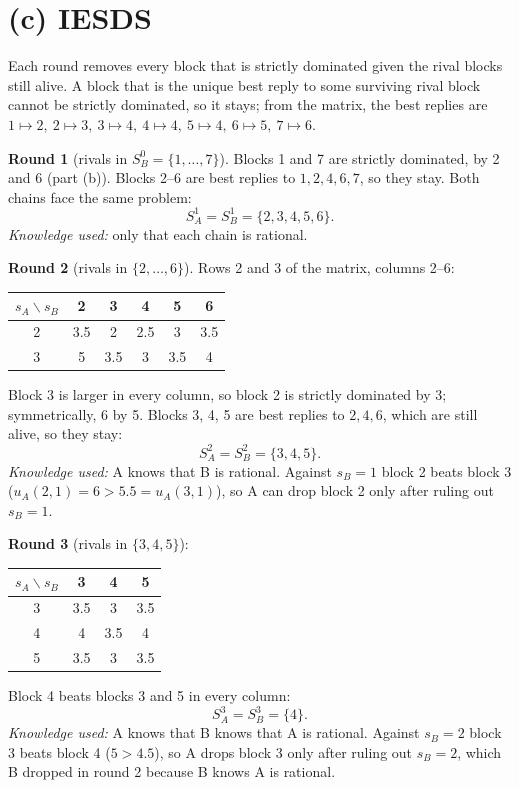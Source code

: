 \documentclass[11pt,a4paper]{article}
\begin{document}
\section*{(c) IESDS}

Each round removes every block that is strictly dominated given the rival blocks still alive. A
block that is the unique best reply to some surviving rival block cannot be strictly dominated, so
it stays; from the matrix, the best replies are
$1 \mapsto 2,\ 2 \mapsto 3,\ 3 \mapsto 4,\ 4 \mapsto 4,\ 5 \mapsto 4,\ 6 \mapsto 5,\ 7 \mapsto 6$.

\textbf{Round 1} (rivals in $S_B^0 = \{1, \dots, 7\}$). Blocks 1 and 7 are strictly dominated,
by 2 and 6 (part (b)). Blocks 2--6 are best replies to $1, 2, 4, 6, 7$, so they stay. Both
chains face the same problem:
\[
  S_A^1 = S_B^1 = \{2, 3, 4, 5, 6\}.
\]
\emph{Knowledge used:} only that each chain is rational.

\textbf{Round 2} (rivals in $\{2, \dots, 6\}$). Rows 2 and 3 of the matrix, columns 2--6:
\begin{center}
\begin{tabular}{c|ccccc}
$s_A \backslash s_B$ & 2 & 3 & 4 & 5 & 6 \\ \midrule
2 & 3.5 & 2 & 2.5 & 3 & 3.5 \\
3 & 5 & 3.5 & 3 & 3.5 & 4
\end{tabular}
\end{center}
Block 3 is larger in every column, so block 2 is strictly dominated by 3; symmetrically, 6 by 5.
Blocks 3, 4, 5 are best replies to $2, 4, 6$, which are still alive, so they stay:
\[
  S_A^2 = S_B^2 = \{3, 4, 5\}.
\]
\emph{Knowledge used:} A knows that B is rational. Against $s_B = 1$ block 2 beats block 3
($u_A(2, 1) = 6 > 5.5 = u_A(3, 1)$), so A can drop block 2 only after ruling out $s_B = 1$.

\textbf{Round 3} (rivals in $\{3, 4, 5\}$):
\begin{center}
\begin{tabular}{c|ccc}
$s_A \backslash s_B$ & 3 & 4 & 5 \\ \midrule
3 & 3.5 & 3 & 3.5 \\
4 & 4 & 3.5 & 4 \\
5 & 3.5 & 3 & 3.5
\end{tabular}
\end{center}
Block 4 beats blocks 3 and 5 in every column:
\[
  S_A^3 = S_B^3 = \{4\}.
\]
\emph{Knowledge used:} A knows that B knows that A is rational. Against $s_B = 2$ block 3 beats
block 4 ($5 > 4.5$), so A drops block 3 only after ruling out $s_B = 2$, which B dropped in
round 2 because B knows A is rational.
\end{document}
